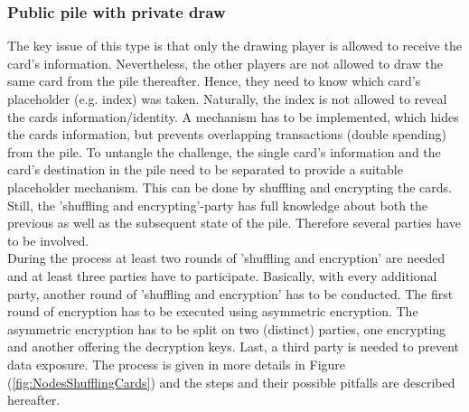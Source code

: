 \subsubsection{Public pile with private draw}
\label{sec:PPwPd}
The key issue of this type is that only the drawing player is allowed to receive the card's information.
Nevertheless, the other players are not allowed to draw the same card from the pile thereafter.
Hence, they need to know which card's placeholder (e.g. index) was taken.
Naturally, the index is not allowed to reveal the cards information/identity.
A mechanism has to be implemented, which hides the cards information, but prevents overlapping transactions (double spending) from the pile.
To untangle the challenge, the single card's information and the card's destination in the pile need to be separated to provide a suitable placeholder mechanism.
This can be done by shuffling and encrypting the cards.
Still, the 'shuffling and encrypting'-party has full knowledge about both the previous as well as the subsequent state of the pile.
Therefore several parties have to be involved. \\
During the process at least two rounds of 'shuffling and encryption' are needed and at least three parties have to participate.
Basically, with every additional party, another round of 'shuffling and encryption' has to be conducted.
The first round of encryption has to be executed using asymmetric encryption.
The asymmetric encryption has to be split on two (distinct) parties, one encrypting and another offering the decryption keys.
Last, a third party is needed to prevent data exposure.
The process is given in more details in Figure (\ref{fig:NodesShufflingCards}) and the steps and their possible pitfalls are described hereafter. \\
\begin{figure}[!b]
\end{figure}

